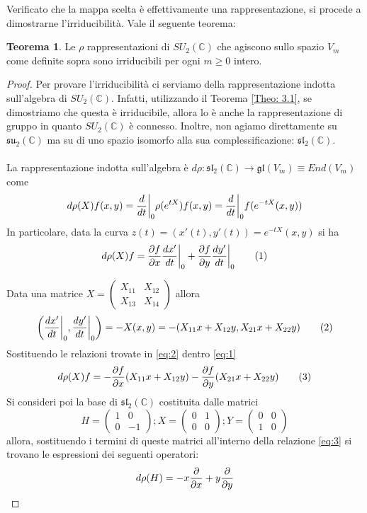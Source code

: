 \documentclass[12pt,a4paper]{report}
\theoremstyle{definition}
\newtheorem{Theo}[Def]{Teorema}
\theoremstyle{definition}
\theoremstyle{definition}
\theoremstyle{definition}
\begin{document}
Verificato che la mappa scelta è effettivamente una rappresentazione, si procede a dimostrarne l'irriducibilità. Vale il seguente teorema:
\begin{Theo} \label{Theo1}
	Le $\rho$ rappresentazioni di $SU_2(\mathbb{C})$ che agiscono sullo spazio $V_m$ come definite sopra sono irriducibili per ogni $m\geq 0$ intero.
\end{Theo}
\begin{proof}
	Per provare l'irriducibilità ci serviamo della rappresentazione indotta sull'algebra di $SU_2(\mathbb{C})$. Infatti, utilizzando il Teorema \ref{Theo: 3.1}, se dimostriamo che questa è irriducibile, allora lo è anche la rappresentazione di gruppo in quanto $SU_2(\mathbb{C})$ è connesso. Inoltre, non agiamo direttamente su $\mathfrak{su_2(\mathbb{C})}$ ma su di uno spazio isomorfo alla sua complessificazione: $\mathfrak{sl_2(\mathbb{C})}$.\\
	\\
	La rappresentazione indotta sull'algebra è $d\rho:\mathfrak{sl_2(\mathbb{C})}\rightarrow \mathfrak{gl}(V_m)\equiv End(V_m)$ come 
	$$d\rho(X)f(x,y)={d\over dt}\bigg{\rvert}_{0}\rho(e^{tX})f(x,y)={d\over dt}\bigg{\rvert}_{0}f(e^{-tX}(x,y))$$
	In particolare, data la curva $z(t)=(x'(t),y'(t))=e^{-tX}(x,y)$ si ha 
	\begin{equation}
		d\rho(X)f={\partial f\over \partial x}{dx'\over dt}\bigg{\rvert}_0+{\partial f\over \partial y}{dy'\over dt}\bigg{\rvert}_0 \label{eq:1} \tag{1}
	\end{equation}
	
	Data una matrice  
	$X=\begin{pmatrix}
		X_{11}&X_{12}\\
		X_{13}&X_{14}
	\end{pmatrix}$ allora 
\begin{equation}
	\bigg{(}{dx'\over dt}\bigg{\rvert}_0,{dy'\over dt}\bigg{\rvert}_0\bigg{)}=-X(x,y)=-(X_{11}x+X_{12}y,X_{21}x+X_{22}y)\label{eq:2} \tag{2}
\end{equation}
Sostituendo le relazioni trovate in \ref{eq:2} dentro \ref{eq:1}
\begin{equation}
d\rho(X)f=-{\partial f\over \partial x}(X_{11}x+X_{12}y)-{\partial f\over \partial y}(X_{21}x+X_{22}y) \label{eq:3} \tag{3}
\end{equation}
	Si consideri poi la base di $\mathfrak{sl_2(\mathbb{C})}$ costituita dalle matrici $$H=
	\begin{pmatrix}
		1&0\\
		0&-1
	\end{pmatrix}; 
	X=\begin{pmatrix}
		0&1\\
		0&0
	\end{pmatrix};
	Y=\begin{pmatrix}
		0&0\\
		1&0
	\end{pmatrix}$$ allora, sostituendo i termini di queste matrici all'interno della relazione \ref{eq:3} si trovano le espressioni dei seguenti operatori:
\begin{equation*}
	d\rho(H)=-x{\partial\over\partial x}+y{\partial\over\partial y}
\end{equation*}


\end{proof}
\end{document}
